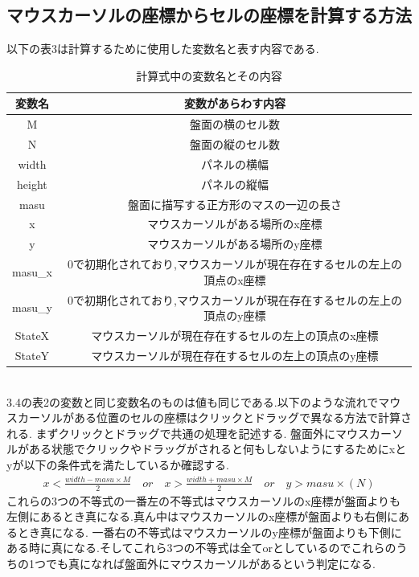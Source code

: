 \documentclass[dvipdfmx]{jarticle}
\begin{document}
\subsection{マウスカーソルの座標からセルの座標を計算する方法}
以下の表3は計算するために使用した変数名と表す内容である.
\begin{table}[h]
    \centering
    \begin{tabular}{|c||c|}
        \hline
        変数名 & 変数があらわす内容\\
        \hline\hline
        M & 盤面の横のセル数\\\hline
        N & 盤面の縦のセル数\\\hline
        width & パネルの横幅\\\hline
        height & パネルの縦幅\\\hline
        masu & 盤面に描写する正方形のマスの一辺の長さ\\\hline
        x & マウスカーソルがある場所のx座標\\\hline
        y & マウスカーソルがある場所のy座標\\\hline
        masu\_x & 0で初期化されており,マウスカーソルが現在存在するセルの左上の頂点のx座標\\\hline
        masu\_y & 0で初期化されており,マウスカーソルが現在存在するセルの左上の頂点のy座標\\\hline
        StateX & マウスカーソルが現在存在するセルの左上の頂点のx座標\\\hline
        StateY & マウスカーソルが現在存在するセルの左上の頂点のy座標\\\hline
    \end{tabular}
    \caption{計算式中の変数名とその内容}
    \end{table}
\\3.4の表2の変数と同じ変数名のものは値も同じである.以下のような流れでマウスカーソルがある位置のセルの座標はクリックとドラッグで異なる方法で計算される.
まずクリックとドラッグで共通の処理を記述する.
盤面外にマウスカーソルがある状態でクリックやドラッグがされると何もしないようにするためにxとyが以下の条件式を満たしているか確認する.
\begin{align}
    x < \frac{width-masu\times M}{2} \quad or \quad x> \frac{width+masu\times M}{2}\quad or \quad y > masu\times (N)
\end{align}
これらの3つの不等式の一番左の不等式はマウスカーソルのx座標が盤面よりも左側にあるとき真になる.真ん中はマウスカーソルのx座標が盤面よりも右側にあるとき真になる.
一番右の不等式はマウスカーソルのy座標が盤面よりも下側にある時に真になる.そしてこれら3つの不等式は全てorとしているのでこれらのうちの1つでも真になれば盤面外にマウスカーソルがあるという判定になる.
\end{document}
